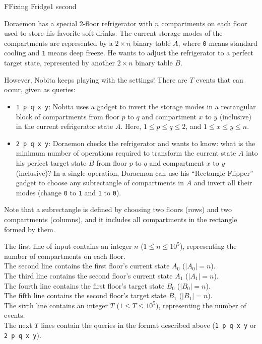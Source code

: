 \begin{problem}{F}{Fixing Fridge}{1 second}

\noindent
Doraemon has a special 2-floor refrigerator with $n$ compartments on each floor used to store his favorite soft drinks. The current storage modes of the compartments are represented by a $2 \times n$ binary table $A$, where \texttt{0} means standard cooling and \texttt{1} means deep freeze. He wants to adjust the refrigerator to a perfect target state, represented by another $2 \times n$ binary table $B$.

However, Nobita keeps playing with the settings! There are $T$ events that can occur, given as queries:
\begin{itemize}
  \item \texttt{1 p q x y}: Nobita uses a gadget to invert the storage modes in a rectangular block of compartments from floor $p$ to $q$ and compartment $x$ to $y$ (inclusive) in the current refrigerator state $A$. Here, $1 \le p \le q \le 2$, and $1 \le x \le y \le n$.
  \item \texttt{2 p q x y}: Doraemon checks the refrigerator and wants to know: what is the minimum number of operations required to transform the current state $A$ into his perfect target state $B$ from floor $p$ to $q$ and compartment $x$ to $y$ (inclusive)? In a single operation, Doraemon can use his ``Rectangle Flipper'' gadget to choose any subrectangle of compartments in $A$ and invert all their modes (change \texttt{0} to \texttt{1} and \texttt{1} to \texttt{0}).
\end{itemize}

\noindent
Note that a subrectangle is defined by choosing two floors (rows) and two compartments (columns), and it includes all compartments in the rectangle formed by them.

\InputFile

\noindent
The first line of input contains an integer $n$ ($1 \le n \le 10^5$), representing the number of compartments on each floor.\\
The second line contains the first floor's current state $A_0$ ($|A_0| = n$).\\
The third line contains the second floor's current state $A_1$ ($|A_1| = n$).\\
The fourth line contains the first floor's target state $B_0$ ($|B_0| = n$).\\
The fifth line contains the second floor's target state $B_1$ ($|B_1| = n$).\\
The sixth line contains an integer $T$ ($1 \le T \le 10^5$), representing the number of events.\\
The next $T$ lines contain the queries in the format described above (\texttt{1 p q x y} or \texttt{2 p q x y}).


\end{problem}
